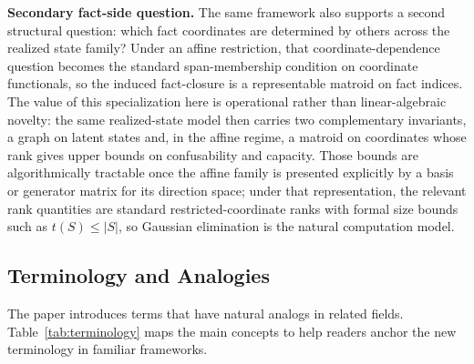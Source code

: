 \noindent\textbf{Secondary fact-side question.} The same framework also supports a second structural question: which fact coordinates are determined by others across the realized state family? Under an affine restriction, that coordinate-dependence question becomes the standard span-membership condition on coordinate functionals, so the induced fact-closure is a representable matroid on fact indices. The value of this specialization here is operational rather than linear-algebraic novelty: the same realized-state model then carries two complementary invariants, a graph on latent states and, in the affine regime, a matroid on coordinates whose rank gives upper bounds on confusability and capacity. Those bounds are algorithmically tractable once the affine family is presented explicitly by a basis or generator matrix for its direction space; under that representation, the relevant rank quantities are standard restricted-coordinate ranks with formal size bounds such as $t(S)\le |S|$, so Gaussian elimination is the natural computation model.

\subsection{Terminology and Analogies}\label{sec:terminology}

The paper introduces terms that have natural analogs in related fields. Table~\ref{tab:terminology} maps the main concepts to help readers anchor the new terminology in familiar frameworks.

